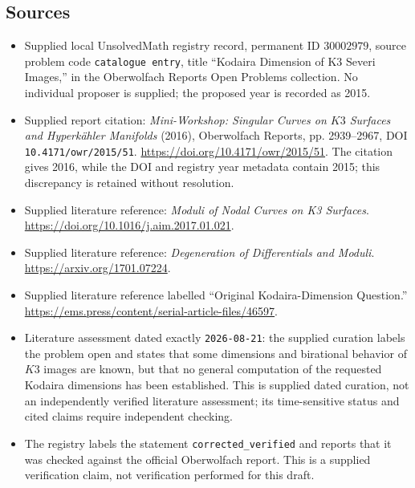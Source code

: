 \documentclass[11pt]{article}
\begin{document}
\subsection{Sources}
\begin{itemize}
\item Supplied local UnsolvedMath registry record, permanent ID \(30002979\), source problem code \texttt{catalogue entry}, title ``Kodaira Dimension of K3 Severi Images,'' in the Oberwolfach Reports Open Problems collection. No individual proposer is supplied; the proposed year is recorded as 2015.
\item Supplied report citation: \emph{Mini-Workshop: Singular Curves on \(K3\) Surfaces and Hyperkähler Manifolds} (2016), Oberwolfach Reports, pp. 2939--2967, DOI \texttt{10.4171/owr/2015/51}. \url{https://doi.org/10.4171/owr/2015/51}. The citation gives 2016, while the DOI and registry year metadata contain 2015; this discrepancy is retained without resolution.
\item Supplied literature reference: \emph{Moduli of Nodal Curves on K3 Surfaces}. \url{https://doi.org/10.1016/j.aim.2017.01.021}.
\item Supplied literature reference: \emph{Degeneration of Differentials and Moduli}. \url{https://arxiv.org/1701.07224}.
\item Supplied literature reference labelled ``Original Kodaira-Dimension Question.'' \url{https://ems.press/content/serial-article-files/46597}.
\item Literature assessment dated exactly \texttt{2026-08-21}: the supplied curation labels the problem open and states that some dimensions and birational behavior of \(K3\) images are known, but that no general computation of the requested Kodaira dimensions has been established. This is supplied dated curation, not an independently verified literature assessment; its time-sensitive status and cited claims require independent checking.
\item The registry labels the statement \texttt{corrected\_verified} and reports that it was checked against the official Oberwolfach report. This is a supplied verification claim, not verification performed for this draft.
\end{itemize}
\end{document}
